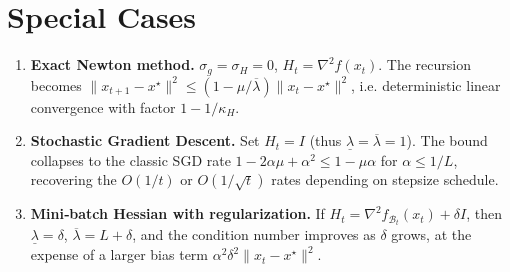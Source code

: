 \documentclass[11pt]{article}
\begin{document}
\section{Special Cases}
\begin{enumerate}[leftmargin=*]
\item \textbf{Exact Newton method.} $\sigma_{g}=\sigma_{H}=0$, $H_{t}=\nabla^{2}f(x_{t})$.
The recursion becomes $\|x_{t+1}-x^{\star}\|^{2}\le(1-\mu/\overline{\lambda})\|x_{t}-x^{\star}\|^{2}$,
i.e. deterministic linear convergence with factor $1-1/\kappa_{H}$.
\item \textbf{Stochastic Gradient Descent.} Set $H_{t}=I$ (thus $\underline{\lambda}=\overline{\lambda}=1$).
The bound collapses to the classic SGD rate
$1-2\alpha\mu+\alpha^{2} \le 1-\mu\alpha$ for $\alpha\le 1/L$,
recovering the $O(1/t)$ or $O(1/\sqrt{t})$ rates depending on stepsize schedule.
\item \textbf{Mini‑batch Hessian with regularization.} If $H_{t}= \nabla^{2}f_{\mathcal{B}_{t}}(x_{t})+\delta I$,
then $\underline{\lambda}=\delta$, $\overline{\lambda}=L+\delta$, and the condition number
improves as $\delta$ grows, at the expense of a larger bias term $\alpha^{2}\delta^{2}\|x_{t}-x^{\star}\|^{2}$.
\end{enumerate}
\end{document}
